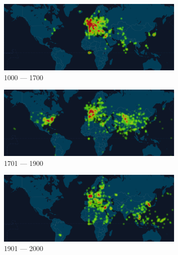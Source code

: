 \begin{figure}[!t]
	\centering
	\begin{subfigure}[b]{0.495\linewidth}
		\centering
		\includegraphics[width=\linewidth]{figures/1000-1700.png}
		\caption[]%
		{{\small 1000 --- 1700}}    
		\label{fig:geodens_1000-1700}
	\end{subfigure}
	\begin{subfigure}[b]{0.495\linewidth}  
		\centering 
		\includegraphics[width=\linewidth]{figures/1700-1900.png}
		\caption[]%
		{{\small 1701 --- 1900}}    
		\label{fig:geodens_1700-1900}
	\end{subfigure}
	\baselineskip
	\begin{subfigure}[b]{0.495\linewidth}   
		\centering 
		\includegraphics[width=\linewidth]{figures/1900-2000.png}
		\caption[]%
		{{\small 1901 --- 2000}}    
		\label{fig:geodens_1900-2000}
	\end{subfigure}
	\begin{subfigure}[b]{0.495\linewidth}   

\end{subfigure}
\end{figure}
